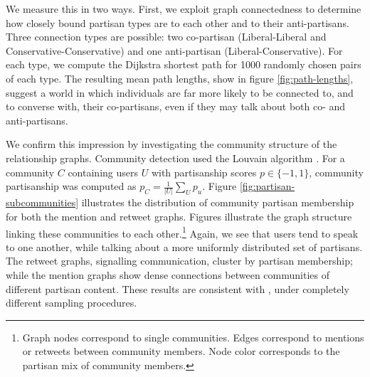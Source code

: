 \documentclass{article}
\begin{document}
We measure this in two ways. First, we exploit graph connectedness to
determine how closely bound partisan types are to each other and to
their anti-partisans. Three connection types are possible: two
co-partisan (Liberal-Liberal and Conservative-Conservative) and one
anti-partisan (Liberal-Conservative). For each type, we compute the
Dijkstra shortest path for 1000 randomly chosen pairs of each
type. The resulting mean path lengths, show in figure
\ref{fig:path-lengths}, suggest a world in which individuals are far
more likely to be connected to, and to converse with, their
co-partisans, even if they may talk about both co- and anti-partisans.

We confirm this impression by investigating the community structure of
the relationship graphs. Community detection used the Louvain
algorithm \cite{blondel2008fast}. For a community $C$ containing
users $U$ with partisanship scores $p \in \{-1, 1\}$, community partisanship was computed
as $p_C = \frac{1}{\left|U\right|}\sum_U p_u$. Figure
\ref{fig:partisan-subcommunities} 
illustrates the distribution of community partisan membership
for both the mention and retweet graphs. Figures
 illustrate the graph
structure linking these communities to each other.\footnote{Graph
  nodes correspond to single communities. Edges correspond to mentions
or retweets between community members. Node color corresponds to the
partisan mix of community members.} Again, we see that users tend
to speak to one another, while talking about a more uniformly
distributed set of partisans. The retweet graphs, signalling
communication, cluster by partisan membership; while the mention
graphs show dense connections between communities of different
partisan content. These results are consistent with
\cite{conover2011}, under completely different sampling procedures. 



\end{document}
